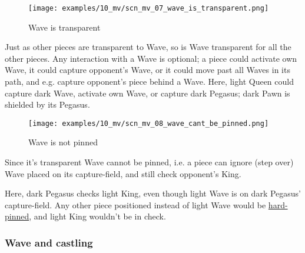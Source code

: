 \vspace*{-1.4\baselineskip}
\noindent
\begin{figure}[!h]
\texttt{[image: examples/10\_mv/scn\_mv\_07\_wave\_is\_transparent.png]}
\vspace*{-1.4\baselineskip}
\caption{Wave is transparent}
\label{fig:scn_mv_07_wave_is_transparent}
\end{figure}

\vspace*{-0.5\baselineskip}
Just as other pieces are transparent to Wave, so is Wave transparent for all the
other pieces. Any interaction with a Wave is optional; a piece could activate own
Wave, it could capture opponent's Wave, or it could move past all Waves in its path,
and e.g. capture opponent's piece behind a Wave. \newline
\indent
Here, light Queen could capture dark Wave, activate own Wave, or capture dark
Pegasus; dark Pawn is shielded by its Pegasus.

\clearpage %

\vspace*{-2.1\baselineskip}
\noindent
\begin{figure}[!h]
\texttt{[image: examples/10\_mv/scn\_mv\_08\_wave\_cant\_be\_pinned.png]}
\vspace*{-1.3\baselineskip}
\caption{Wave is not pinned}
\label{fig:scn_mv_08_wave_cant_be_pinned}
\end{figure}

\vspace*{-0.5\baselineskip}
Since it's transparent Wave cannot be pinned, i.e. a piece can ignore (step over)
Wave placed on its capture-field, and still check opponent's King.

Here, dark Pegasus checks light King, even though light Wave is on dark Pegasus'
capture-field. Any other piece positioned instead of light Wave would be
\href{https://en.wikipedia.org/wiki/Pin_(chess)#Absolute_pin}{hard-pinned},
and light King wouldn't be in check.

\clearpage %

\subsubsection*{Wave and castling}
\label{sec:Miranda's veil/Wave/Cascading Waves/Wave and castling}

